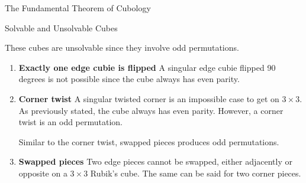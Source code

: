 \documentclass[final]{beamer}
\newlength{\colwidth}
\begin{document}
\begin{frame}[t]
\begin{columns}[t]
\begin{column}{\colwidth}
\begin{alertblock}{The Fundamental Theorem of Cubology}

  \end{alertblock}

  \begin{block}{Solvable and Unsolvable Cubes}

    These cubes are unsolvable since they involve odd permutations.

    \begin{enumerate}
      
      \item \textbf{Exactly one edge cubie is flipped}
      A singular edge cubie flipped 90 degrees is not possible since the cube always has even parity.
      
      \item \textbf{Corner twist}
      A singular twisted corner is an impossible case to get on $3 \times 3$.
      As previously stated, the cube always has even parity. However, a corner twist is an odd permutation.
      

Similar to the corner twist, swapped pieces produces odd permutations.
      \item \textbf{Swapped pieces}
      Two edge pieces cannot be swapped, either adjacently or opposite on a $3 \times 3$ Rubik's cube. The same can be said for two corner pieces.
    \end{enumerate}


\end{block}
\end{column}
\end{columns}
\end{frame}
\end{document}
